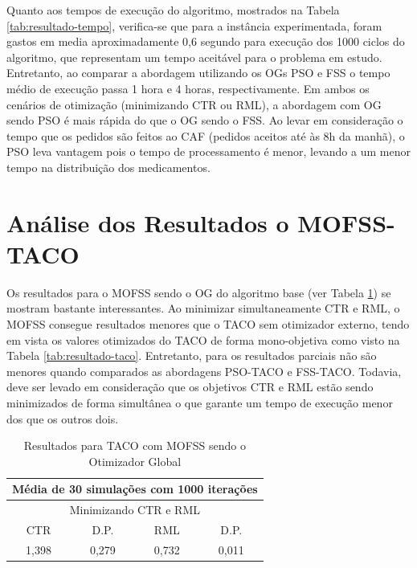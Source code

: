 Quanto aos tempos de execução do algoritmo, mostrados na Tabela \ref{tab:resultado-tempo}, verifica-se que para a instância experimentada, foram gastos em media aproximadamente 0,6 segundo para execução dos 1000 ciclos do algoritmo, que representam um tempo aceitável para o problema em estudo. Entretanto, ao comparar a abordagem utilizando os OGs PSO e FSS o tempo médio de execução passa 1 hora e 4 horas, respectivamente. Em ambos os cenários de otimização (minimizando CTR ou RML), a abordagem com OG sendo PSO é mais rápida do que o OG sendo o FSS. Ao levar em consideração o tempo que os pedidos são feitos ao CAF (pedidos aceitos até às 8h da manhã), o PSO leva vantagem pois o tempo de processamento é menor, levando a um menor tempo na distribuição dos medicamentos.

\section{Análise dos Resultados o MOFSS-TACO}
\label{sec-resultados-tempo}

Os resultados para o MOFSS sendo o OG do algoritmo base (ver Tabela \ref{tab:resultado-mofss}) se mostram bastante interessantes. Ao minimizar simultaneamente CTR e RML, o MOFSS consegue resultados menores que o TACO sem otimizador externo, tendo em vista os valores otimizados do TACO de forma mono-objetiva como visto na Tabela \ref{tab:resultado-taco}. Entretanto, para os resultados parciais não são menores quando comparados as abordagens PSO-TACO e FSS-TACO. Todavia, deve ser levado em consideração que os objetivos CTR e RML estão sendo minimizados de forma simultânea o que garante um tempo de execução menor dos que os outros dois.

\begin{table}[htb]
    \centering
    \caption{Resultados para TACO com MOFSS sendo o Otimizador Global} \label{tab:resultado-mofss}
    \begin{tabular}{|c|c|c|c|}
    \hline
    \multicolumn{4}{|c|}{Média de 30 simulações com 1000 iterações} \\ \hline
    \multicolumn{4}{|c|}{Minimizando CTR e RML}                     \\ \hline
    CTR            & D.P.          & RML            & D.P.          \\ \hline
    1,398          & 0,279         & 0,732          & 0,011         \\ \hline
    \end{tabular}
    \end{table}

